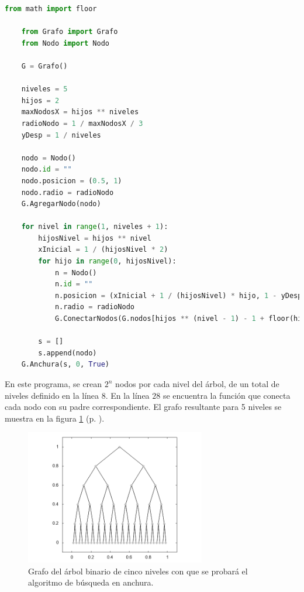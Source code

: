 \documentclass{article}
\begin{document}
  \begin{lstlisting}[language=Python]
    from math import floor

    from Grafo import Grafo
    from Nodo import Nodo

    G = Grafo()

    niveles = 5
    hijos = 2
    maxNodosX = hijos ** niveles
    radioNodo = 1 / maxNodosX / 3
    yDesp = 1 / niveles

    nodo = Nodo()
    nodo.id = ""
    nodo.posicion = (0.5, 1)
    nodo.radio = radioNodo
    G.AgregarNodo(nodo)

    for nivel in range(1, niveles + 1):
        hijosNivel = hijos ** nivel
        xInicial = 1 / (hijosNivel * 2)
        for hijo in range(0, hijosNivel):
            n = Nodo()
            n.id = ""
            n.posicion = (xInicial + 1 / (hijosNivel) * hijo, 1 - yDesp * nivel)
            n.radio = radioNodo
            G.ConectarNodos(G.nodos[hijos ** (nivel - 1) - 1 + floor(hijo / hijos)], n)

        s = []
        s.append(nodo)
    G.Anchura(s, 0, True)
  \end{lstlisting}

  En este programa, se crean $2^n$ nodos por cada nivel del árbol, de un total de niveles definido en la línea $8$. En la línea $28$ se encuentra la función que conecta cada nodo con su padre correspondiente. El grafo resultante para 5 niveles se muestra en la figura \ref{arbolBinario} (p. \pageref{arbolBinario}).

  \begin{figure}[h]
    \includegraphics[width=0.7\textwidth]{arbolBinario}
    \centering
    \caption{Grafo del árbol binario de cinco niveles con que se probará el algoritmo de búsqueda en anchura.}
    \label{arbolBinario}
  \end{figure}
\end{document}
